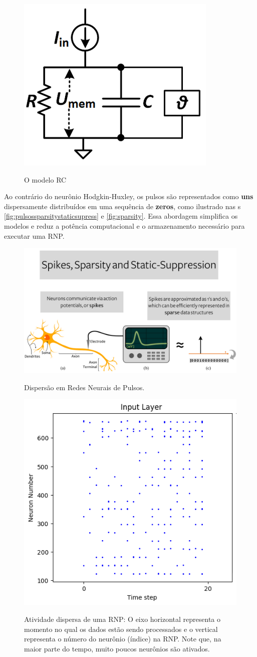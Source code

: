 			\begin{figure}[h]
				\centering
				\caption[Modelo RC]{O modelo RC}
				\includegraphics[width=0.3\linewidth]{images/rcmodel}
				\label{fig:rcmodel}
			\end{figure}
			
			\par Ao contrário do neurônio Hodgkin-Huxley, os pulsos são representados como \textbf{uns} dispersamente distribuídos em uma sequência de \textbf{zeros}, como ilustrado nas s \autoref{fig:pulsossparsitystaticsupress} e \autoref{fig:sparsity}. Essa abordagem simplifica os modelos e reduz a potência computacional e o armazenamento necessário para executar uma RNP.
			
			\begin{figure}[H]
				\centering
				\caption{Dispersão em Redes Neurais de Pulsos.}
				\includegraphics[width=.8\linewidth]{images/spikesSparsityStaticSupress}
				\label{fig:pulsossparsitystaticsupress}
			\end{figure}
			
			\begin{figure}[H]
				\centering
				\caption[Atividade dispersa de uma RNP]{Atividade dispersa de uma RNP: O eixo horizontal representa o momento no qual os dados estão sendo processados e o vertical representa o número do neurônio (índice) na RNP. Note que, na maior parte do tempo, muito poucos neurônios são ativados.}
				\includegraphics[width=.4\linewidth]{images/sparsity}
				\label{fig:sparsity}
			\end{figure}
						
